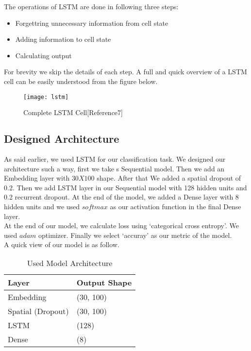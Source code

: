 The operations of LSTM are done in following three steps:
\begin{itemize}
    \item Forgettring unnecessary information from cell state
    \item Adding information to cell state
    \item Calculating output
\end{itemize}

For brevity we skip the details of each step. A full and quick overview of a LSTM cell can be easily understood from the figure below. \\

\begin{figure}[h]
    \centering
    \texttt{[image: lstm]}
    \caption{Complete LSTM Cell[Reference7]}
\end{figure}
\vline


\subsection{Designed Architecture}		
As said earlier, we used LSTM for our classification task. We designed our architecture such a way, first we take s Sequential model. Then we add an Embedding layer with $30X100$ shape. After that We added a spatial dropout of 0.2. Then we add LSTM layer in our Sequential model with 128 hidden units and 0.2 recurrent dropout. At the end of the model, we added a Dense layer with 8 hidden units and we used $softmax$ as our activation function in the final Dense layer. \\

At the end of our model, we calculate loss using `categorical cross entropy'. We used $adam$ optimizer. Finally we select `accuray' as our metric of the model. \\

A quick view of our model is as follow. \\

\begin{table}[]
    \centering
    \begin{tabular}{|l|l|}
        \hline
        Layer             & Output Shape \\ \hline
        Embedding         & (30, 100)    \\ \hline
        Spatial (Dropout) & (30, 100)    \\ \hline
        LSTM              & (128)        \\ \hline
        Dense             & (8)          \\ \hline
    \end{tabular}
    \caption{Used Model Architecture}
\end{table}

